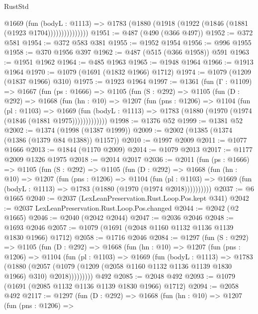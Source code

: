 \begin{lexlean}{RustStd}
\begin{coremodule}
{\begin{coremodule}
{{{{{{{{{{                  @1669
                    (fun (bodyL : @1113) =>
                    @1783 (@1880 (@1918 (@1922 (@1846 (@1881 (@1923 @1704)))))))))))))))
@1951 := @487 (@490 (@366 @497))
@1952 := @372 @581
@1954 := @372 @583 @381
@1955 := @1952 @1954
@1956 := @996 @1955
@1958 := @370 @1956 @397
@1962 := @487 (@515 (@366 @1958)) @591
@1963 := @1951 @1962
@1964 := @485 @1963
@1965 := @1948 @1964
@1966 := @1913 @1964
@1970 := @1079 (@1691 (@1832 @1966) @1712)
@1974 := @1079 (@1209 (@1837 @1966) @310)
@1975 := @1923 @1964
@1997 := @1361
    (fun (Γ : @1109) =>
    @1667
      (fun (ps : @1666) =>
      @1105
        (fun (S : @292) =>
        @1105
          (fun (D : @292) =>
          @1668
            (fun (hn : @10) =>
            @1207
              (fun (pns : @1206) =>
              @1104
                (fun (pl : @1103) =>
                @1669
                  (fun (bodyL : @1113) =>
                  @1783 (@1880 (@1970 (@1974 (@1846 (@1881 @1975)))))))))))))
@1998 := @1376 @52
@1999 := @1381 @52
@2002 := @1374 (@1998 (@1387 @1999))
@2009 := @2002 (@1385 (@1374 (@1386 (@1379 @84 @1388)) @1157))
@2010 := @1997 @2009
@2011 := @1077 @1666
@2013 := @1844 (@1170 @2009)
@2014 := @1079 @2013
@2017 := @1177 @2009 @1326 @1975
@2018 := @2014 @2017
@2036 := @2011
    (fun (ps : @1666) =>
    @1105
      (fun (S : @292) =>
      @1105
        (fun (D : @292) =>
        @1668
          (fun (hn : @10) =>
          @1207
            (fun (pns : @1206) =>
            @1104
              (fun (pl : @1103) =>
              @1669 (fun (bodyL : @1113) => @1783 (@1880 (@1970 (@1974 @2018))))))))))
@2037 := @6 @1665
@2040 := @2037 (LexLeanPreservation.Rust.Loop.Pos.kept @341)
@2042 := @2037 LexLeanPreservation.Rust.Loop.Pos.changed
@2044 := @2042 (@2 @1665)
@2046 := @2040 (@2042 @2044)
@2047 := @2036 @2046
@2048 := @1693 @2046
@2057 := @1079 (@1691 (@2048 @1160 @1132 @1136 @1139 @1830 @1966) @1712)
@2058 := @1716 @2046
@2084 := @1297
    (fun (S : @292) =>
    @1105
      (fun (D : @292) =>
      @1668
        (fun (hn : @10) =>
        @1207
          (fun (pns : @1206) =>
          @1104
            (fun (pl : @1103) =>
            @1669
              (fun (bodyL : @1113) =>
              @1783
                (@1880
                  (@2057
                    (@1079 (@1209 (@2058 @1160 @1132 @1136 @1139 @1830 @1966) @310) @2018)))))))))
    @492
@2085 := @2048 @492
@2093 := @1079 (@1691 (@2085 @1132 @1136 @1139 @1830 @1966) @1712)
@2094 := @2058 @492
@2117 := @1297
    (fun (D : @292) =>
    @1668
      (fun (hn : @10) =>
      @1207
        (fun (pns : @1206) =>
}}}}}}}}}}
\end{coremodule}}
\end{coremodule}
\end{lexlean}
